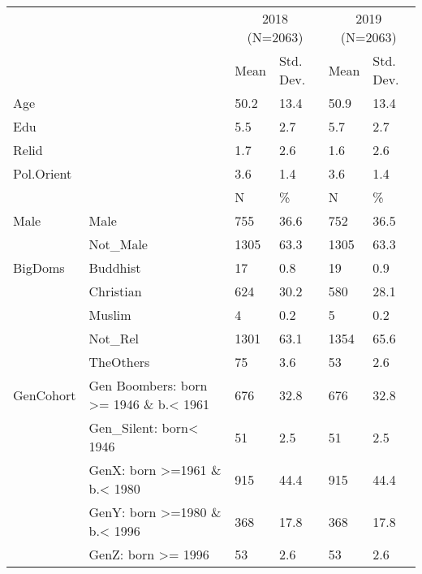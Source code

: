 \begin{table}
\centering
\begin{tabular}[t]{llllll}
\toprule
\multicolumn{2}{c}{ } & \multicolumn{2}{c}{2018 (N=2063)} & \multicolumn{2}{c}{2019 (N=2063)} \\
\cmidrule(l{3pt}r{3pt}){3-4} \cmidrule(l{3pt}r{3pt}){5-6}
  &    & Mean & Std. Dev. & Mean  & Std. Dev. \\
\midrule
Age &  & 50.2 & 13.4 & 50.9 & 13.4\\
Edu &  & 5.5 & 2.7 & 5.7 & 2.7\\
Relid &  & 1.7 & 2.6 & 1.6 & 2.6\\
Pol.Orient &  & 3.6 & 1.4 & 3.6 & 1.4\\
\midrule
 &  & N & \% & N & \%\\
Male & Male & 755 & 36.6 & 752 & 36.5\\
 & Not\_Male & 1305 & 63.3 & 1305 & 63.3\\
BigDoms & Buddhist & 17 & 0.8 & 19 & 0.9\\
 & Christian & 624 & 30.2 & 580 & 28.1\\
 & Muslim & 4 & 0.2 & 5 & 0.2\\
 & Not\_Rel & 1301 & 63.1 & 1354 & 65.6\\
 & TheOthers & 75 & 3.6 & 53 & 2.6\\
GenCohort & Gen Boombers: born >= 1946 \& b.< 1961 & 676 & 32.8 & 676 & 32.8\\
 & Gen\_Silent: born< 1946 & 51 & 2.5 & 51 & 2.5\\
 & GenX: born >=1961 \& b.< 1980 & 915 & 44.4 & 915 & 44.4\\
 & GenY: born >=1980 \& b.< 1996 & 368 & 17.8 & 368 & 17.8\\
 & GenZ: born >= 1996 & 53 & 2.6 & 53 & 2.6\\
\bottomrule
\end{tabular}
\end{table}
